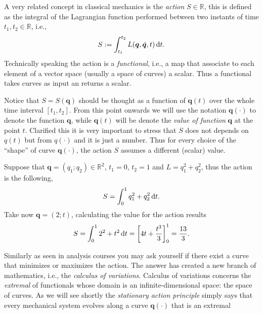		A very related concept in classical mechanics is the \emph{action} $S\in\mathbb{R}$,
		this is defined as the integral of the Lagrangian function performed between 
		two instants of time $t_{1},t_{2}\in\mathbb{R}$, i.e.,
		\begin{equation}
			\label{eq:actiondefinition}
			S := \int_{t_{1}}^{t_{2}}L(\bm{q},\dot{\bm{q}},t)\mathop{}\!\mathrm{d} t.
		\end{equation}
		Technically speaking the action is a \emph{functional}, i.e., a 
		map that associate to each element of a vector space (usually a space of curves) a scalar. 
		Thus a functional takes curves as input an returns a scalar.
		\begin{remark}
			Notice that $S=S(\bm{q})$ should be thought as a function of
			$\bm{q}(t)$ over the whole time interval $[t_{1},t_{2}]$.
			From this point onwards we will use the notation $\bm{q}(\cdot)$
			to denote the function $\bm{q}$,
			while $\bm{q}(t)$ will be denote the \emph{value of function}
			$\bm{q}$ at the point $t$. Clarified this it is very important
			to stress that $S$ does not depends on $q(t)$ but from $q(\cdot)$
			and it is just a number.
			Thus for every choice of the ``shape'' of curve $\bm{q}(\cdot)$, 
			the action $S$ assumes a different (scalar) value.
		\end{remark}
		\begin{example}
			Suppose that $\bm{q} = (q_{1};q_{2})\in\mathbb{R}^{2}$, 
			$t_{1} = 0$, $t_{2} = 1$ and $L = q_{1}^{2} + q_{2}^{2}$,
			thus the action is the following, 
			\begin{equation*}
				S = \int_{0}^{1} q_{1}^2 +q_{2}^{2}\mathop{}\!\mathrm{d} t.
			\end{equation*}
			Take now $\bm{q} = (2;t)$, calculating the value for the action results
			\begin{equation*}
				S = \int_{0}^{1} 2^{2} + t^{2}\mathop{}\!\mathrm{d} t = \left[4t+\frac{t^{3}}{3}\right]_{0}^{1} = \frac{13}{3}.
			\end{equation*}
		\end{example}
		Similarly as seen in analysis courses you may ask yourself if there 
		exist a curve that minimizes or maximizes the action.
		The answer has created a new branch of mathematics, i.e., the
		\emph{calculus of variations}. Calculus of variations concerns the \emph{extremal}
		of functionals whose domain is an infinite-dimensional space: the space of curves.
		As we will see shortly the \emph{stationary action principle} simply says that
		every mechanical system evolves along a curve $\bm{q}(\cdot)$ that is an extremal
